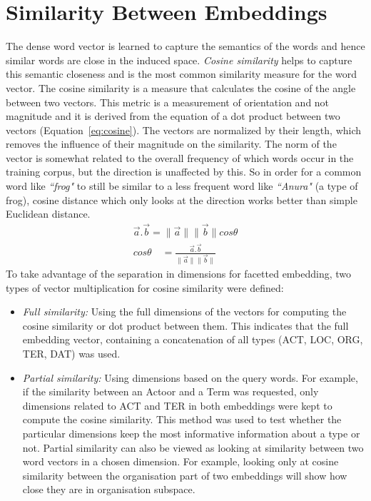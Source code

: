 \section{Similarity Between Embeddings }
The dense word vector is learned to capture the semantics of the words and hence similar words are close in the induced space. \emph{Cosine similarity} helps to capture this semantic closeness and is the most common similarity measure for the word vector. The cosine similarity is a measure that calculates the cosine of the angle between two vectors. This metric is a measurement of orientation and not magnitude and it is derived from the equation of a dot product between two vectors (Equation~\ref{eq:cosine}). The vectors are normalized by their length, which removes the influence of their magnitude on the similarity. The norm of the vector is somewhat related to the overall frequency of which words occur in the training corpus, but the direction is unaffected by this. So in order for a common word like \emph{``frog"} to still be similar to a less frequent word like \emph{``Anura"} (a type of frog), cosine distance which only looks at the direction works better than simple Euclidean distance.
\begin{equation}
\begin{split}
\overrightarrow { a } .\overrightarrow { b } =\parallel \overrightarrow { a } \parallel \parallel \overrightarrow { b } \parallel cos\theta 
\\
cos\theta \quad =\frac { \overrightarrow { a } .\overrightarrow { b }  }{ \parallel \overrightarrow { a } \parallel \parallel \overrightarrow { b } \parallel  } \quad
\end{split}
\label{eq:cosine}
\end{equation}
\noindent
To take advantage of the separation in dimensions for facetted embedding, two types of vector multiplication for cosine similarity were defined: 
\begin{itemize}
\item \emph{Full similarity:} Using the full dimensions of the vectors for computing the cosine similarity or dot product between them. This indicates that the full embedding vector, containing a concatenation of all types (ACT, LOC, ORG, TER, DAT) was used. 
\item \emph{Partial similarity:} Using dimensions based on the query words. For example, if the similarity between an Actoor and a Term was requested, only dimensions related to ACT and TER in both embeddings were kept to compute the cosine similarity. This method was used to test whether the particular dimensions keep the most informative information about a type or not. Partial similarity can also be viewed as looking at similarity between two word vectors in a chosen dimension. For example, looking only at cosine similarity between the organisation part of two embeddings will show how close they are in organisation subspace. 
\end{itemize}